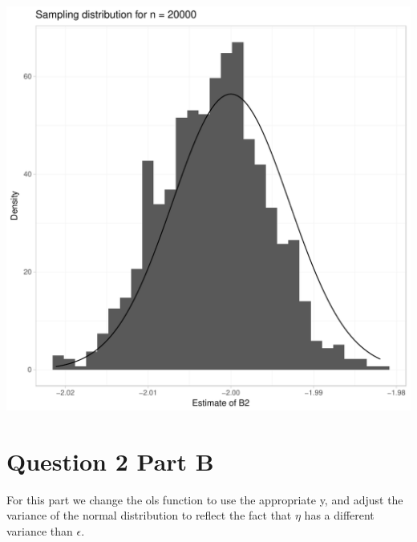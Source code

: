 \documentclass[english, 11pt]{article}\usepackage[]{graphicx}\usepackage[]{color}
\makeatletter
\def\maxwidth{ %
  \ifdim\Gin@nat@width>\linewidth
    \linewidth
  \else
    \Gin@nat@width
  \fi
}
\newenvironment{knitrout}{}{} %
\makeatother
\begin{document}
\begin{knitrout}
\includegraphics[width=\maxwidth]{figure/Q2_looping-5} 

\end{knitrout}


\newpage
\noindent \section*{Question 2 Part B}
\noindent For this part we change the ols function to use the appropriate y, and adjust the variance of the normal distribution to reflect the fact that $\eta$ has a different variance than $\epsilon$.  
\end{document}
